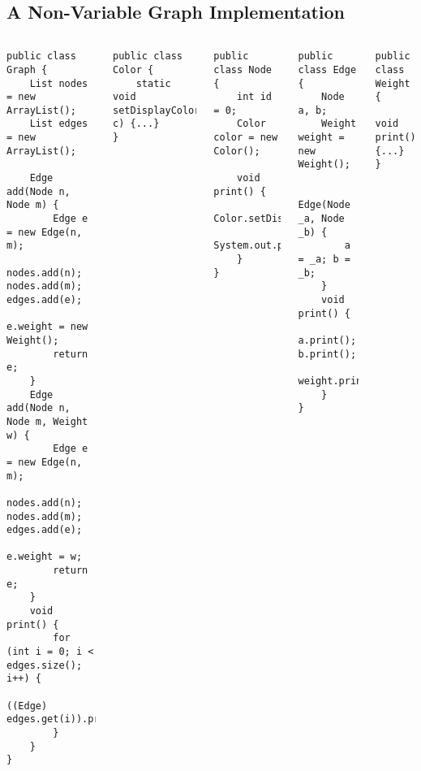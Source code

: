 \subsection{A Non-Variable Graph Implementation}
\begin{frame}[fragile]{\insertsubsection}
	\begin{tiny}
		\begin{columns}
\begin{lstlisting}
public class Graph {
	List nodes = new ArrayList();
	List edges = new ArrayList();

	Edge add(Node n, Node m) {
		Edge e = new Edge(n, m);
		nodes.add(n); nodes.add(m); edges.add(e);
		e.weight = new Weight();
		return e;
	}
	Edge add(Node n, Node m, Weight w) {
		Edge e = new Edge(n, m);
		nodes.add(n); nodes.add(m); edges.add(e);
		e.weight = w;
		return e;
	}
	void print() {
		for (int i = 0; i < edges.size(); i++) {
			((Edge) edges.get(i)).print();
		}
	}
}
\end{lstlisting}
\begin{lstlisting}
public class Color {
	static void setDisplayColor(Color c) {...}
}
\end{lstlisting}	
\begin{lstlisting}
public class Node {
	int id = 0;
	Color color = new Color();

	void print() {
		Color.setDisplayColor(color);
		System.out.print(id);
	}
}
\end{lstlisting}
\begin{lstlisting}
public class Edge {
	Node a, b;
	Weight weight = new Weight();

	Edge(Node _a, Node _b) {
		a = _a; b = _b;
	}
	void print() {
		a.print(); b.print();
		weight.print();
	}
}
\end{lstlisting}
\begin{lstlisting}
public class Weight {
	void print() {...}
}
\end{lstlisting}
		\end{columns}
	\end{tiny}
\end{frame}

